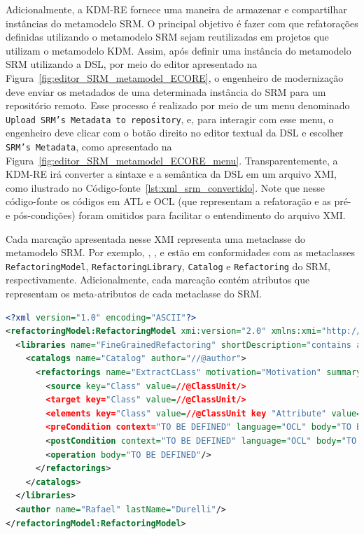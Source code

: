 Adicionalmente, a KDM-RE fornece uma maneira de armazenar e compartilhar instâncias do metamodelo SRM. O principal objetivo é fazer com que refatorações definidas utilizando o metamodelo SRM sejam reutilizadas em projetos que utilizam o metamodelo KDM. Assim, após definir uma instância do metamodelo SRM utilizando a DSL, por meio do editor apresentado na Figura~\ref{fig:editor_SRM_metamodel_ECORE}, o engenheiro de modernização deve enviar os metadados de uma determinada instância do SRM para um repositório remoto. Esse processo é realizado por meio de um menu denominado \texttt{Upload SRM's Metadata to repository}, e, para interagir com esse menu, o engenheiro deve clicar com o botão direito no editor textual da DSL e escolher \texttt{SRM's Metadata}, como apresentado na Figura~\ref{fig:editor_SRM_metamodel_ECORE_menu}. Transparentemente, a KDM-RE irá converter a sintaxe e a semântica da DSL em um arquivo XMI, como ilustrado no Código-fonte~\ref{lst:xml_srm_convertido}. Note que nesse código-fonte os códigos em ATL e OCL (que representam a refatoração e as pré- e pós-condições) foram omitidos para facilitar o entendimento do arquivo XMI. 

Cada marcação apresentada nesse XMI representa uma metaclasse do metamodelo SRM. Por exemplo, , ,  e  estão em conformidades com as metaclasses \texttt{RefactoringModel}, \texttt{RefactoringLibrary}, \texttt{Catalog} e \texttt{Refactoring} do SRM, respectivamente. Adicionalmente, cada marcação contém atributos que representam os meta-atributos de cada metaclasse do SRM.

\begin{lstlisting}[language=XML, frame=single, basicstyle={\scriptsize}, mathescape=true, label={lst:xml_srm_convertido}, caption={Arquivo XMI representando a instância do SRM.}]
<?xml version="1.0" encoding="ASCII"?>
<refactoringModel:RefactoringModel xmi:version="2.0" xmlns:xmi="http://www.omg.org/XMI" xmlns:xsi="http://www.w3.org/2001/XMLSchema-instance" xmlns:refactoringModel="http://refactoringModel/1.0">
  <libraries name="FineGrainedRefactoring" shortDescription="contains a set of refactorings" description="refactorings">
    <catalogs name="Catalog" author="//@author">
      <refactorings name="ExtractCLass" motivation="Motivation" summary="Summary">
        <source key="Class" value=//@ClassUnit/>
        <target key="Class" value=//@ClassUnit/>
        <elements key="Class" value=//@ClassUnit key "Attribute" value=//@StorableUnit/>
        <preCondition context="TO BE DEFINED" language="OCL" body="TO BE DEFINED"/>
        <postCondition context="TO BE DEFINED" language="OCL" body="TO BE DEFINED"/>
        <operation body="TO BE DEFINED"/>
      </refactorings>
    </catalogs>
  </libraries>
  <author name="Rafael" lastName="Durelli"/>
</refactoringModel:RefactoringModel>
\end{lstlisting}


